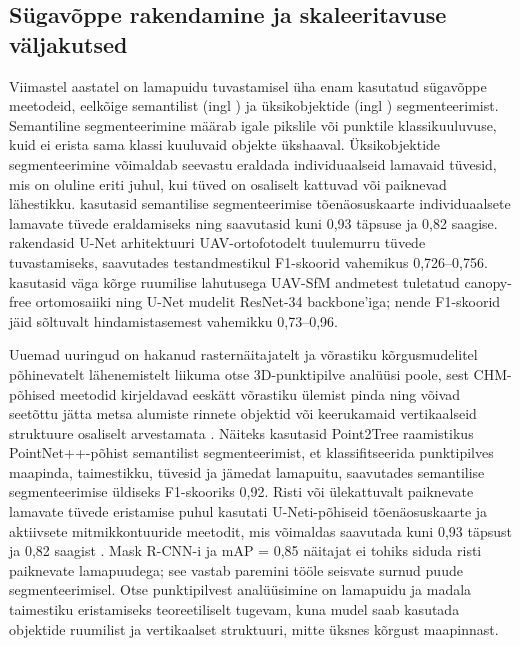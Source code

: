\subsection{Sügavõppe rakendamine ja skaleeritavuse väljakutsed}

Viimastel aastatel on lamapuidu tuvastamisel üha enam kasutatud sügavõppe meetodeid, eelkõige semantilist (ingl ) ja üksikobjektide (ingl ) segmenteerimist. Semantiline segmenteerimine määrab igale pikslile või punktile klassikuuluvuse, kuid ei erista sama klassi kuuluvaid objekte ükshaaval. Üksikobjektide segmenteerimine võimaldab seevastu eraldada individuaalseid lamavaid tüvesid, mis on oluline eriti juhul, kui tüved on osaliselt kattuvad või paiknevad lähestikku. \textcite{polewski_instance_2021} kasutasid semantilise segmenteerimise tõenäosuskaarte individuaalsete lamavate tüvede eraldamiseks ning saavutasid kuni 0,93 täpsuse ja 0,82 saagise. \textcite{reder_detection_2022} rakendasid U-Net arhitektuuri UAV-ortofotodelt tuulemurru tüvede tuvastamiseks, saavutades testandmestikul F1-skoorid vahemikus 0,726--0,756. \textcite{dietenberger_accurate_2025} kasutasid väga kõrge ruumilise lahutusega UAV-SfM andmetest tuletatud canopy-free ortomosaiiki ning U-Net mudelit ResNet-34 backbone’iga; nende F1-skoorid jäid sõltuvalt hindamistasemest vahemikku 0,73--0,96.

Uuemad uuringud on hakanud rasternäitajatelt ja võrastiku kõrgusmudelitel põhinevatelt lähenemistelt liikuma otse 3D-punktipilve analüüsi poole, sest CHM-põhised meetodid kirjeldavad eeskätt võrastiku ülemist pinda ning võivad seetõttu jätta metsa alumiste rinnete objektid või keerukamaid vertikaalseid struktuure osaliselt arvestamata \parencite{xiang_automated_2024}. Näiteks \textcite{wielgosz_point2treep2tframework_2023} kasutasid Point2Tree raamistikus PointNet++-põhist semantilist segmenteerimist, et klassifitseerida punktipilves maapinda, taimestikku, tüvesid ja jämedat lamapuitu, saavutades semantilise segmenteerimise üldiseks F1-skooriks 0,92. Risti või ülekattuvalt paiknevate lamavate tüvede eristamise puhul kasutati U-Neti-põhiseid tõenäosuskaarte ja aktiivsete mitmikkontuuride meetodit, mis võimaldas saavutada kuni 0,93 täpsust ja 0,82 saagist \parencite{polewski_instance_2021}. Mask R-CNN-i ja mAP = 0,85 näitajat ei tohiks siduda risti paiknevate lamapuudega; see vastab paremini \textcite{sani-mohammed_instance_2022} tööle seisvate surnud puude segmenteerimisel. Otse punktipilvest analüüsimine on lamapuidu ja madala taimestiku eristamiseks teoreetiliselt tugevam, kuna mudel saab kasutada objektide ruumilist ja vertikaalset struktuuri, mitte üksnes kõrgust maapinnast.

